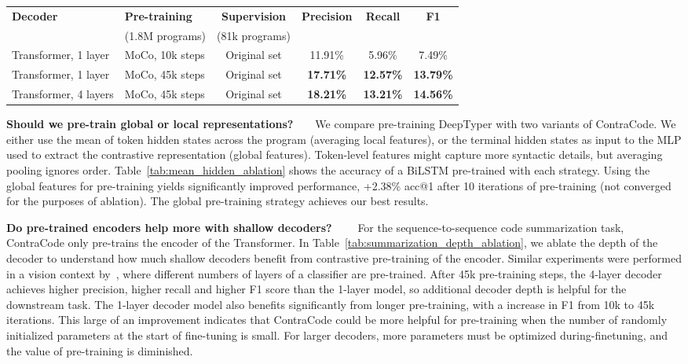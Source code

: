 \documentclass[11pt]{article}
\newcommand{\thou}[0]{}
\newcommand{\ours}[0]{ContraCode}
\begin{document}
\begin{table*}
\caption{Training time and decoder depth ablation on the method name prediction task. Longer pre-training significantly improves downstream performance when a shallow, 1 layer decoder is used.} 
\label{tab:summarization_depth_ablation}
\footnotesize
\centering
\begin{tabular}{llcccc} \hline
    \multirow{2}{*}{\textbf{Decoder}} & \textbf{Pre-training} & \textbf{Supervision} & \multirow{2}{*}{\textbf{Precision}} & \multirow{2}{*}{\textbf{Recall}} & \multirow{2}{*}{\textbf{F1}}\\
    & (1.8M programs) & (81k programs) & \\
    \hline
    Transformer, 1 layer & MoCo, 10k steps & Original set & 11.91\% & 5.96\% & 7.49\%\\
    Transformer, 1 layer & MoCo, 45k steps & Original set & \textbf{17.71\%} & \textbf{12.57\%} & \textbf{13.79\%}\\
    Transformer, 4 layers & MoCo, 45k steps & Original set & \textbf{18.21\%} & \textbf{13.21\%} & \textbf{14.56\%} \\
     \hline 
\end{tabular}
\end{table*}


\textbf{Should we pre-train global or local representations?}~~~~We compare pre-training DeepTyper with two variants of \ours{}. We either use the mean of token hidden states across the program (averaging local features), or the terminal hidden states as input to the MLP used to extract the contrastive representation  (global features). Token-level features might capture more syntactic details, but averaging pooling ignores order. Table~\ref{tab:mean_hidden_ablation} shows the accuracy of a BiLSTM pre-trained with each strategy. Using the global features for pre-training yields significantly improved performance, +2.38\% acc@1 after 10\thou{} iterations of pre-training (not converged for the purposes of ablation). The global pre-training strategy achieves our best results.

\textbf{Do pre-trained encoders help more with shallow decoders?}~~~~
For the sequence-to-sequence code summarization task, \ours{} only pre-trains the encoder of the Transformer. In Table~\ref{tab:summarization_depth_ablation}, we ablate the depth of the decoder to understand how much shallow decoders benefit from contrastive pre-training of the encoder. Similar experiments were performed in a vision context by~\cite{erhan2010does}, where different numbers of layers of a classifier are pre-trained. After 45k pre-training steps, the 4-layer decoder achieves  higher precision,  higher recall and  higher F1 score than the 1-layer model, so additional decoder depth is helpful for the downstream task. The 1-layer decoder model also benefits significantly from longer pre-training, with a  increase in F1 from 10k to 45k iterations. This large of an improvement indicates that \ours{} could be more helpful for pre-training when the number of randomly initialized parameters at the start of fine-tuning is small. For larger decoders, more parameters must be optimized during-finetuning, and the value of pre-training is diminished.
\end{document}

